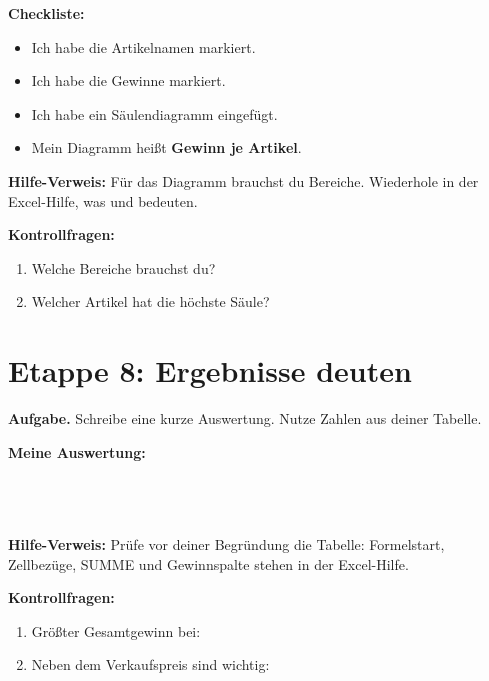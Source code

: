 \begin{boxK}
\textbf{Checkliste:}
\begin{itemize}
\item[$\square$] Ich habe die Artikelnamen  markiert.
\item[$\square$] Ich habe die Gewinne  markiert.
\item[$\square$] Ich habe ein Säulendiagramm eingefügt.
\item[$\square$] Mein Diagramm heißt \textbf{Gewinn je Artikel}.
\end{itemize}
\end{boxK}

\begin{boxTipp}
\textbf{Hilfe-Verweis:} Für das Diagramm brauchst du Bereiche. Wiederhole in der Excel-Hilfe, was  und  bedeuten.
\end{boxTipp}

\textbf{Kontrollfragen:}
\begin{enumerate}[label=\alph*)]
\item Welche Bereiche brauchst du? \linie[8cm]
\item Welcher Artikel hat die höchste Säule? \antwortfeld[3cm]
\end{enumerate}

\medskip
\section*{Etappe 8: Ergebnisse deuten}
\begin{boxHinweis}
\textbf{Aufgabe.} Schreibe eine kurze Auswertung. Nutze Zahlen aus deiner Tabelle.
\end{boxHinweis}

\textbf{Meine Auswertung:}\\[0.8cm]
\linie\\[0.8cm]
\linie\\[0.8cm]
\linie\\[0.8cm]
\linie

\begin{boxTipp}
\textbf{Hilfe-Verweis:} Prüfe vor deiner Begründung die Tabelle: Formelstart, Zellbezüge, SUMME und Gewinnspalte stehen in der Excel-Hilfe.
\end{boxTipp}

\textbf{Kontrollfragen:}
\begin{enumerate}[label=\alph*)]
\item Größter Gesamtgewinn bei: \antwortfeld[3cm]
\item Neben dem Verkaufspreis sind wichtig: \linie[7cm]
\end{enumerate}

